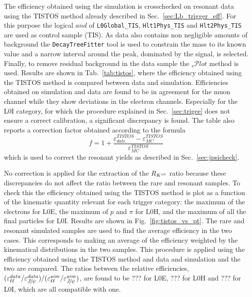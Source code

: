 The efficiency obtained using the simulation
is crosschecked on resonant data using the TISTOS method already described in Sec.~\ref{sec:Lb_trigger_eff}.
%
%
For this purpose the logical $and$ of \verb!L0Global_TIS!, \verb!Hlt1Phys_TIS! and \verb!Hlt2Phys_TIS!
are used as control sample (TIS). As data also contains non negligible amounts of background
the \verb!DecayTreeFitter! tool is used to constrain the \jpsi mass to its known value
and a narrow interval around the peak, dominated by the signal, is selected.
Finally, to remove residual background in the data sample the $_{s}\mathcal{P}lot$ method is used. 
Results are shown in Tab.~\ref{tab:tistos}, where the
efficiency obtained using the TISTOS method is compared between data and simulation.
Efficiencies obtained on simulation and data are found to be in agreement for the muon channel
while they show deviations in the electron channels. Especially for the L0I category,
for which the procedure explained in Sec.~\ref{sec:trigee} does not ensure a correct calibration,
a significant discrepancy is found. The table also reports a correction factor
obtained according to the formula
\begin{equation}
f = 1 + \frac{\varepsilon_{date}^{TISTOS} - \varepsilon_{MC}^{TISTOS}}{\varepsilon_{MC}^{TISTOS}}
\end{equation}
which is used to correct the resonant yields as described in Sec.~\ref{sec:jpsicheck}.

No correction is applied for the extraction of the $R_{{{K}^{*0}}}$ ratio because
these discrepancies do not affect the ratio between the rare and resonant samples.
To check this the efficiency obtained using the TISTOS method
is plot as a function of the kinematic quantity relevant for each trigger category:
the maximum \pt of the electrons for L0E, the maximum \pt of $p$ and $\pi$ for L0H,
and the maximum \pt of all the final particles for L0I. Results are shown in Fig.~\ref{fig:tistos_vs_pt}.
The rare and resonant simulated samples are used to find the average efficiency in the two cases.
This corresponds to making an average of the efficiency weighted by the kinematical distributions
in the two samples. This procedure is applied using the efficiency obtained using the TISTOS method
and data and simulation and the two are compared. The ratios between the relative efficiencies, 
$(\varepsilon^{data}_{\ell\ell} / \varepsilon^{data}_{\jpsi}) / (\varepsilon^{sim}_{\ell\ell} / \varepsilon^{sim}_{\jpsi})$,
are found to be ??? for L0E, ??? for L0H and ??? for L0I, which are all compatible with one. 

